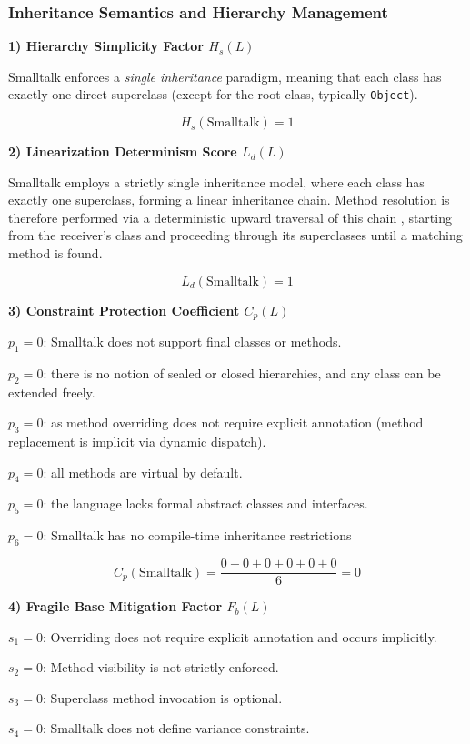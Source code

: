 \subsubsection{Inheritance Semantics and Hierarchy Management}

\textbf{1) Hierarchy Simplicity Factor $H_s(L)$}

Smalltalk enforces a \emph{single inheritance} paradigm, meaning that each class has exactly one direct superclass (except for the root class, typically \texttt{Object}).

\[
    H_s(\text{Smalltalk}) = 1
\]

\textbf{2) Linearization Determinism Score $L_d(L)$}

Smalltalk employs a strictly single inheritance model, where each class has exactly one superclass, forming a linear inheritance chain. Method resolution is therefore performed via a deterministic upward traversal of this chain \cite{goldberg1983smalltalk}, starting from the receiver’s class and proceeding through its superclasses until a matching method is found.

\[
    L_d(\text{Smalltalk})=1
\]

\textbf{3) Constraint Protection Coefficient $C_p(L)$}

$p_1=0$: Smalltalk does not support final classes or methods.

$p_2=0$: there is no notion of sealed or closed hierarchies, and any class can be extended freely.

$p_3=0$: as method overriding does not require explicit annotation (method replacement is implicit via dynamic dispatch).

$p_4=0$: all methods are virtual by default.

$p_5=0$: the language lacks formal abstract classes and interfaces.

$p_6=0$: Smalltalk has no compile-time inheritance restrictions 

\[
    C_p(\text{Smalltalk})=\frac{0+0+0+0+0+0}{6}=0
\]

\textbf{4) Fragile Base Mitigation Factor $F_b(L)$}

$s_1=0$: Overriding does not require explicit annotation and occurs implicitly.

$s_2=0$: Method visibility is not strictly enforced.

$s_3=0$: Superclass method invocation is optional.

$s_4=0$: Smalltalk does not define variance constraints.

